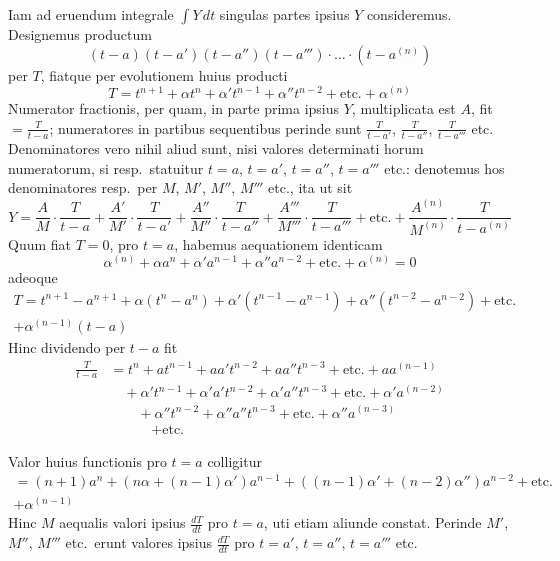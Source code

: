 \documentclass[12pt,a4paper]{article}
\begin{document}
Iam ad eruendum integrale $\int\!Y\,dt$ singulas partes ipsius $Y$ consideremus. Designemus productum
\[
(t-a)(t-a')(t-a'')(t-a''')\cdot\ldots\cdot(t-a^{(n)})
\]
per $T$, fiatque per evolutionem huius producti
\[
T = t^{n+1} + \alpha t^n + \alpha' t^{n-1} + \alpha'' t^{n-2} + \text{etc.} + \alpha^{(n)}
\]
Numerator fractionis, per quam, in parte prima ipsius $Y$, multiplicata est $A$, fit $=\frac{T}{t-a}$; numeratores in partibus sequentibus perinde sunt $\frac{T}{t-a'}$, $\frac{T}{t-a''}$, $\frac{T}{t-a'''}$ etc. Denominatores vero nihil aliud sunt, nisi valores determinati horum numeratorum, si resp.\ statuitur $t=a$, $t=a'$, $t=a''$, $t=a'''$ etc.: denotemus hos denominatores resp.\ per $M$, $M'$, $M''$, $M'''$ etc., ita ut sit
\[
Y = \frac{A}{M}\cdot\frac{T}{t-a} + \frac{A'}{M'}\cdot\frac{T}{t-a'} + \frac{A''}{M''}\cdot\frac{T}{t-a''} + \frac{A'''}{M'''}\cdot\frac{T}{t-a'''} + \text{etc.} + \frac{A^{(n)}}{M^{(n)}}\cdot\frac{T}{t-a^{(n)}}
\]
Quum fiat $T=0$, pro $t=a$, habemus aequationem identicam
\[
\alpha^{(n)} + \alpha a^n + \alpha' a^{n-1} + \alpha'' a^{n-2} + \text{etc.} + \alpha^{(n)} = 0
\]
adeoque
\begin{multline*}
T = t^{n+1} - a^{n+1} + \alpha(t^n-a^n) + \alpha'(t^{n-1}-a^{n-1}) + \alpha''(t^{n-2}-a^{n-2}) + \text{etc.}\\
+ \alpha^{(n-1)}(t-a)
\end{multline*}
Hinc dividendo per $t-a$ fit
\begin{align*}
\frac{T}{t-a} &= t^n + at^{n-1} + aa't^{n-2} + aa''t^{n-3} + \text{etc.} + aa^{(n-1)}\\
&\quad + \alpha't^{n-1} + \alpha'a't^{n-2} + \alpha'a''t^{n-3} + \text{etc.} + \alpha'a^{(n-2)}\\
&\quad\quad + \alpha''t^{n-2} + \alpha''a''t^{n-3} + \text{etc.} + \alpha''a^{(n-3)}\\
&\quad\quad\quad + \text{etc.}
\end{align*}

Valor huius functionis pro $t=a$ colligitur
\begin{multline*}
= (n+1)a^n + (n\alpha + (n-1)\alpha')a^{n-1} + ((n-1)\alpha' + (n-2)\alpha'')a^{n-2} + \text{etc.}\\
+ \alpha^{(n-1)}
\end{multline*}
Hinc $M$ aequalis valori ipsius $\frac{dT}{dt}$ pro $t=a$, uti etiam aliunde constat. Perinde $M'$, $M''$, $M'''$ etc.\ erunt valores ipsius $\frac{dT}{dt}$ pro $t=a'$, $t=a''$, $t=a'''$ etc.
\end{document}
